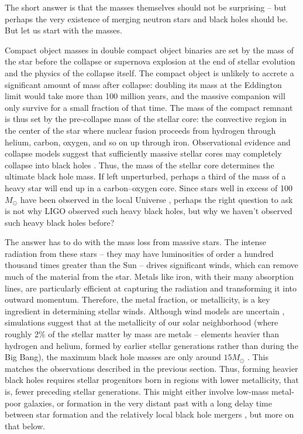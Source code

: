 \documentclass[iop,onecolumn]{revtex4}
\begin{document}
The short answer is that the masses themselves should not be surprising -- but perhaps the very existence of merging neutron stars and black holes should be.  But let us start with the masses.  

Compact object masses in double compact object binaries are set by the mass of the star before the collapse or supernova explosion at the end of stellar evolution and the physics of the collapse itself.  The compact object is unlikely to accrete a significant amount of mass after collapse: doubling its mass at the Eddington limit would take more than 100 million years, and the massive companion will only survive for a small fraction of that time.  The mass of the compact remnant is thus set by the pre-collapse mass of the stellar core: the convective region in the center of the star where nuclear fusion proceeds from hydrogen through helium, carbon, oxygen, and so on up through iron.  Observational evidence and collapse models suggest that sufficiently massive stellar cores may completely collapse into black holes \citep[for a review, see][]{Mirabel:2016}.  Thus, the mass of the stellar core determines the ultimate black hole mass.  If left unperturbed, perhaps a third of the mass of a heavy star will end up in a carbon--oxygen core.  Since stars well in excess of 100 $M_\odot$ have been observed in the local Universe \citep[e.g.,][]{Schneider:2018}, perhaps the right question to ask is not why LIGO observed such heavy black holes, but why we haven't observed such heavy black holes before?  

The answer has to do with the mass loss from massive stars.  The intense radiation from these stars -- they may have luminosities of order a hundred thousand times greater than the Sun -- drives significant winds, which can remove much of the material from the star.  Metals like iron, with their many absorption lines, are particularly efficient at capturing the radiation and transforming it into outward momentum.  Therefore, the metal fraction, or metallicity, is a key ingredient in determining stellar winds.  Although wind models are uncertain \citep[e.g.,][]{Vink,Renzo:2017}, simulations suggest that at the metallicity of our solar neighborhood (where roughly 2\% of the stellar matter by mass are metals -- elements heavier than hydrogen and helium, formed by earlier stellar generations rather than during the Big Bang), the maximum black hole masses are only around $15 M_\odot$ \citep{Belczynski:2011,Spera:2015}.  This matches the observations described in the previous section.  Thus, forming heavier black holes requires stellar progenitors born in regions with lower metallicity, that is, fewer preceding stellar generations.  This might either involve low-mass metal-poor galaxies, or formation in the very distant past with a long delay time between star formation and the relatively local black hole mergers \citep{Belczynski:2016}, but more on that below.
\end{document}
